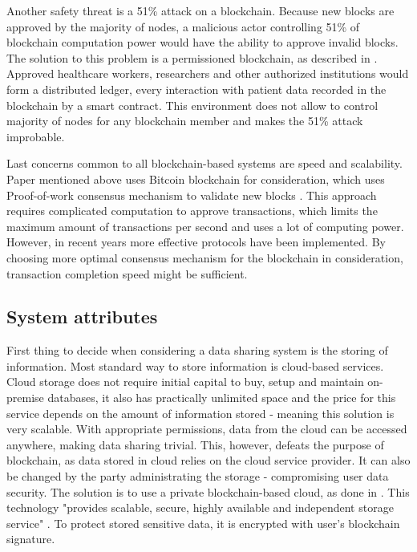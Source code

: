 \documentclass[12pt]{article}
\begin{document}
        Another safety threat is a 51\% attack on a blockchain. Because new blocks are approved by the majority of nodes, a malicious actor controlling 51\% of blockchain computation power would have the ability to approve invalid blocks. The solution to this problem is a permissioned blockchain, as described in \cite{permissioned}. Approved healthcare workers, researchers and other authorized institutions would form a distributed ledger, every interaction with patient data recorded in the blockchain by a smart contract. This environment does not allow to control majority of nodes for any blockchain member and makes the 51\% attack improbable.

        Last concerns common to all blockchain-based systems are speed and scalability. Paper mentioned above uses Bitcoin blockchain for consideration, which uses Proof-of-work consensus mechanism to validate new blocks \cite{dlt}. This approach requires complicated computation to approve transactions, which limits the maximum amount of transactions per second and uses a lot of computing power. However, in recent years more effective protocols have been implemented. By choosing more optimal consensus mechanism for the blockchain in consideration, transaction completion speed might be sufficient.

        \subsection{System attributes}
        First thing to decide when considering a data sharing system is the storing of information. Most standard way to store information is cloud-based services. Cloud storage does not require initial capital to buy, setup and maintain on-premise databases, it also has practically unlimited space and the price for this service depends on the amount of information stored - meaning this solution is very scalable. With appropriate permissions, data from the cloud can be accessed anywhere, making data sharing trivial. This, however, defeats the purpose of blockchain, as data stored in cloud relies on the cloud service provider. It can also be changed by the party administrating the storage - compromising user data security. The solution is to use a private blockchain-based cloud, as done in \cite{gateways}. This technology "provides scalable, secure, highly available and independent storage service" \cite{gateways}. To protect stored sensitive data, it is encrypted with user's blockchain signature.
\end{document}
